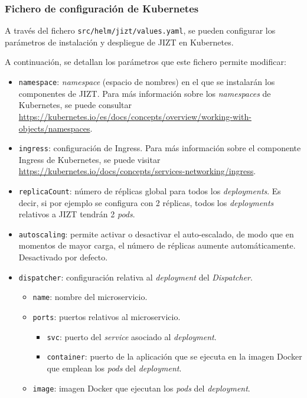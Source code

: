 \subsubsection{Fichero de configuración de Kubernetes}

A través del fichero \texttt{src/helm/jizt/values.yaml}, se pueden configurar los parámetros de instalación y despliegue de JIZT en Kubernetes.

A continuación, se detallan los parámetros que este fichero permite modificar:

\vspace{-0.3cm}
\begin{itemize} [\textbullet]
	\item \texttt{namespace}: \emph{namespace} (espacio de nombres) en el que se instalarán los componentes de JIZT. Para más información sobre los \emph{namespaces} de Kubernetes, se puede consultar \href{https://kubernetes.io/es/docs/concepts/overview/working-with-objects/namespaces}{https://kubernetes.io/es/docs/concepts/\newline overview/working-with-objects/namespaces}.
	
	\item \texttt{ingress}: configuración de Ingress. Para más información sobre el componente Ingress de Kubernetes, se puede visitar \href{https://kubernetes.io/docs/concepts/services-networking/ingress}{https://kubernetes.io/\newline docs/concepts/services-networking/ingress}.
	
	\item \texttt{replicaCount}: número de réplicas global para todos los \emph{deployments}. Es decir, si por ejemplo se configura con 2 réplicas, todos los \emph{deployments} relativos a JIZT tendrán 2 \emph{pods}.
	
	\item \texttt{autoscaling}: permite activar o desactivar el auto-escalado, de modo que en momentos de mayor carga, el número de réplicas aumente automáticamente. Desactivado por defecto.
	
	\item \texttt{dispatcher}: configuración relativa al \emph{deployment} del \emph{Dispatcher}.
	\begin{itemize} [◦]
		\item \texttt{name}: nombre del microservicio.
		\item \texttt{ports}: puertos relativos al microservicio.
		\begin{itemize} [-]
			\item \texttt{svc}: puerto del \emph{service} asociado al \emph{deployment}.
			\item \texttt{container}: puerto de la aplicación que se ejecuta en la imagen Docker que emplean los \emph{pods} del \emph{deployment}.
		\end{itemize}
		\item \texttt{image}: imagen Docker que ejecutan los \emph{pods} del \emph{deployment}.
	\end{itemize}


\end{itemize}
